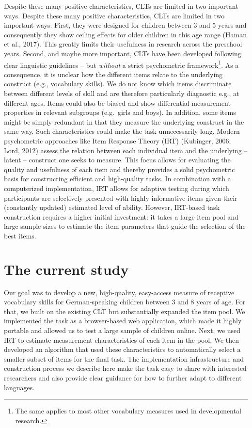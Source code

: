 \documentclass[
  man,floatsintext]{apa6}
\begin{document}
Despite these many positive characteristics, CLTs are limited in two important ways. Despite these many positive characteristics, CLTs are limited in two important ways. First, they were designed for children between 3 and 5 years and consequently they show ceiling effects for older children in this age range (Haman et al., 2017). This greatly limits their usefulness in research across the preschool years. Second, and maybe more important, CLTs have been developed following clear linguistic guidelines -- but \emph{without} a strict psychometric framework\footnote{The same applies to most other vocabulary measures used in developmental research.}. As a consequence, it is unclear how the different items relate to the underlying construct (e.g., vocabulary skills). We do not know which items discriminate between different levels of skill and are therefore particularly diagnostic e.g., at different ages. Items could also be biased and show differential measurement properties in relevant subgroups (e.g.~girls and boys). In addition, some items might be simply redundant in that they measure the underlying construct in the same way. Such characteristics could make the task unnecessarily long. Modern psychometric approaches like Item Response Theory (IRT) (Kubinger, 2006; Lord, 2012) assess the relation between each individual item and the underlying -- latent -- construct one seeks to measure. This focus allows for evaluating the quality and usefulness of each item and thereby provides a solid psychometric basis for constructing efficient and high-quality tasks. In combination with a computerized implementation, IRT allows for adaptive testing during which participants are selectively presented with highly informative items given their (constantly updated) estimated level of ability. However, IRT-based task construction requires a higher initial investment: it takes a large item pool and large sample sizes to estimate the item parameters that guide the selection of the best items.

\hypertarget{the-current-study}{%
\section{The current study}\label{the-current-study}}

Our goal was to develop a new, high-quality, easy-access measure of receptive vocabulary skills for German-speaking children between 3 and 8 years of age. For that, we built on the existing CLT but substantially expanded the item pool. We implemented the task as a browser-based web application, which made it highly portable and allowed us to test a large sample of children online. Next, we used IRT to estimate measurement characteristics of each item in the pool. We then developed an algorithm that used these characteristics to automatically select a smaller subset of items for the final task. The implementation infrastructure and construction process we describe here make the task easy to share with interested researchers and also provide clear guidance for how to further adapt to different languages.
\end{document}
